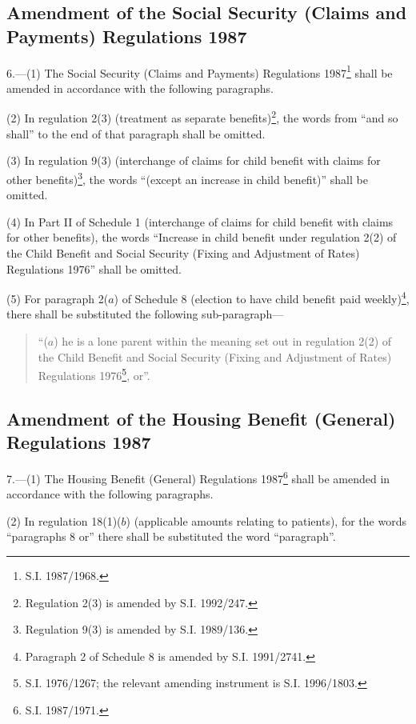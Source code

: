 \documentclass[a4paper]{article}
\newcommand\fnote[1]{\footnote{\frenchspacing #1}}
\begin{document}
\subsection[6. Amendment of the Social Security (Claims and Payments) Regulations 1987]{Amendment of the Social Security (Claims and Payments) Regulations 1987}

6.---(1) The Social Security (Claims and Payments) Regulations 1987\fnote{S.I. 1987/1968.} shall be amended in accordance with the following paragraphs.

(2)  In regulation 2(3) (treatment as separate benefits)\footnote{\frenchspacing Regulation 2(3) is amended by S.I. 1992/247.}, the words from “and so shall” to the end of that paragraph shall be omitted.

(3)  In regulation 9(3) (interchange of claims for child benefit with claims for other benefits)\footnote{\frenchspacing Regulation 9(3) is amended by S.I. 1989/136.}, the words “(except an increase in child benefit)” shall be omitted.

(4)  In Part II of Schedule 1 (interchange of claims for child benefit with claims for other benefits), the words “Increase in child benefit under regulation 2(2) of the Child Benefit and Social Security (Fixing and Adjustment of Rates) Regulations 1976” shall be omitted.

(5)  For paragraph 2($a$) of Schedule 8 (election to have child benefit paid weekly)\footnote{\frenchspacing Paragraph 2 of Schedule 8 is amended by S.I. 1991/2741.}, there shall be substituted the following sub-paragraph—
\begin{quotation}
“($a$) he is a lone parent within the meaning set out in regulation 2(2) of the Child Benefit and Social Security (Fixing and Adjustment of Rates) Regulations 1976\footnote{\frenchspacing S.I. 1976/1267; the relevant amending instrument is S.I. 1996/1803.}, or”.
\end{quotation}

\subsection[7. Amendment of the Housing Benefit (General) Regulations 1987]{Amendment of the Housing Benefit (General) Regulations 1987}

7.---(1) The Housing Benefit (General) Regulations 1987\fnote{S.I. 1987/1971.} shall be amended in accordance with the following paragraphs.

(2)  In regulation 18(1)($b$) (applicable amounts relating to patients), for the words “paragraphs 8 or” there shall be substituted the word “paragraph”.
\end{document}
